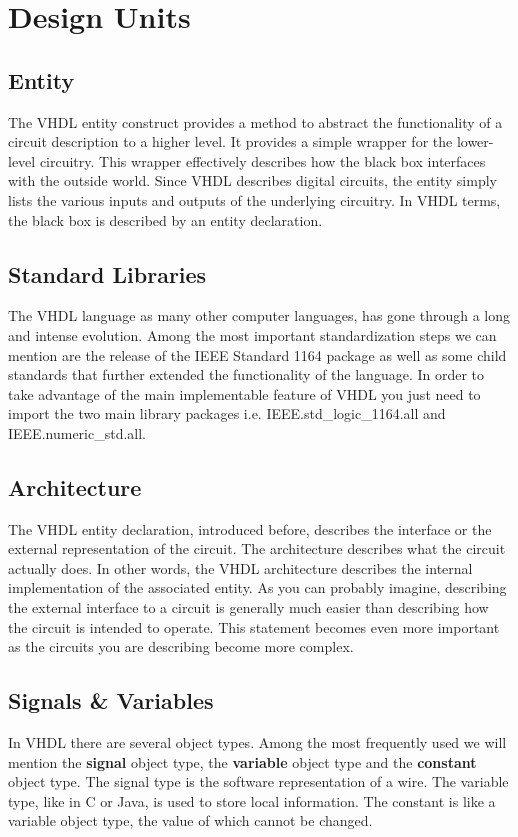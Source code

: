 \documentclass{report}
\begin{document}
\section{Design Units}
\subsection{Entity}
The VHDL entity construct provides a method to abstract the functionality of a circuit description to a higher level. It provides a simple wrapper for the lower-level circuitry. This wrapper effectively describes how the black box interfaces with the outside world. Since VHDL describes digital circuits, the entity simply lists the various inputs and outputs of the underlying circuitry. In VHDL terms, the black box is described by an entity declaration.
\subsection{Standard Libraries}
The VHDL language as many other computer languages, has gone through a long and intense evolution. Among the most important standardization steps we can mention are the release of the IEEE Standard 1164 package as well as some child standards that further extended the functionality of the language. In order to take advantage of the main implementable feature of VHDL you just need to import the two main library packages i.e. IEEE.std\_logic\_1164.all and IEEE.numeric\_std.all. 
\subsection{Architecture}
The VHDL entity declaration, introduced before, describes the interface or the external representation of the circuit. The architecture describes what the circuit actually does. In other words, the VHDL architecture describes the internal implementation of the associated entity. As you can probably imagine, describing the external interface to a circuit is generally much easier than describing how the circuit is intended to operate. This statement becomes even more important as the circuits you are describing
become more complex. 
\subsection{Signals \& Variables}
In VHDL there are several object types. Among the most frequently used
we will mention the \textbf{signal} object type, the \textbf{variable} object type and the \textbf{constant} object type. The signal type is the software representation of a wire. The variable type, like in C or Java, is used to store local information. The constant is like a variable object type, the value of which cannot be changed.
\end{document}
